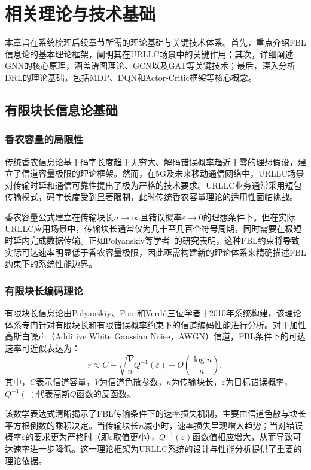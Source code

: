 \chapter{相关理论与技术基础}\label{chap:theory}

本章旨在系统梳理后续章节所需的理论基础与关键技术体系。首先，重点介绍FBL信息论的基本理论框架，阐明其在URLLC场景中的关键作用；其次，详细阐述GNN的核心原理，涵盖谱图理论、GCN以及GAT等关键技术；最后，深入分析DRL的理论基础，包括MDP、DQN和Actor-Critic框架等核心概念。

\section{有限块长信息论基础}

\subsection{香农容量的局限性}

传统香农信息论基于码字长度趋于无穷大、解码错误概率趋近于零的理想假设，建立了信道容量极限的理论框架\cite{chaptertwo1}。然而，在5G及未来移动通信网络中，URLLC场景对传输时延和通信可靠性提出了极为严格的技术要求。URLLC业务通常采用短包传输模式，码字长度受到显著限制，此时传统香农容量理论的适用性面临挑战。

香农容量公式建立在传输块长$n \to \infty$且错误概率$\varepsilon \to 0$的理想条件下。但在实际URLLC应用场景中，传输块长通常仅为几十至几百个符号周期，同时需要在极短时延内完成数据传输。正如Polyanskiy等学者~\cite{chaptertwo1}的研究表明，这种FBL约束将导致实际可达速率明显低于香农容量极限，因此亟需构建新的理论体系来精确描述FBL约束下的系统性能边界。

\subsection{有限块长编码理论}

有限块长信息论由Polyanskiy、Poor和Verd\'{u}三位学者于2010年系统构建\cite{chaptertwo1}，该理论体系专门针对有限块长和有限错误概率约束下的信道编码性能进行分析。对于加性高斯白噪声（Additive White Gaussian Noise，AWGN）信道，FBL条件下的可达速率可近似表达为：
\begin{equation}
r \approx C - \sqrt{\frac{V}{n}}Q^{-1}(\varepsilon) + O\left(\frac{\log n}{n}\right),
\end{equation}
其中，$C$表示信道容量，$V$为信道色散参数，$n$为传输块长，$\varepsilon$为目标错误概率，$Q^{-1}(\cdot)$代表高斯$Q$函数的反函数。

该数学表达式清晰揭示了FBL传输条件下的速率损失机制，主要由信道色散与块长平方根倒数的乘积决定。当传输块长$n$减小时，速率损失呈现增大趋势；当对错误概率$\varepsilon$的要求更为严格时（即$\varepsilon$取值更小），$Q^{-1}(\varepsilon)$函数值相应增大，从而导致可达速率进一步降低。这一理论框架为URLLC系统的设计与性能分析提供了重要的理论依据\cite{chaptertwo2,chaptertwo3}。

